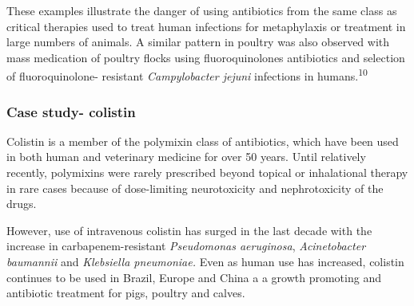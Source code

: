 \documentclass[
]{book}
\begin{document}
These examples illustrate the danger of using antibiotics from the same class as critical therapies used to treat human infections for metaphylaxis or treatment in large numbers of animals. A similar pattern in poultry was also observed with mass medication of poultry flocks using fluoroquinolones antibiotics and selection of fluoroquinolone- resistant \emph{Campylobacter jejuni} infections in humans.\textsuperscript{10}

\hypertarget{case-study--colistin}{%
\subsubsection*{Case study- colistin}\label{case-study--colistin}}

Colistin is a member of the polymixin class of antibiotics, which have been used in both human and veterinary medicine for over 50 years. Until relatively recently, polymixins were rarely prescribed beyond topical or inhalational therapy in rare cases because of dose-limiting neurotoxicity and nephrotoxicity of the drugs.

However, use of intravenous colistin has surged in the last decade with the increase in carbapenem-resistant \emph{Pseudomonas aeruginosa}, \emph{Acinetobacter baumannii} and \emph{Klebsiella pneumoniae.} Even as human use has increased, colistin continues to be used in Brazil, Europe and China a a growth promoting and antibiotic treatment for pigs, poultry and calves.
\end{document}
